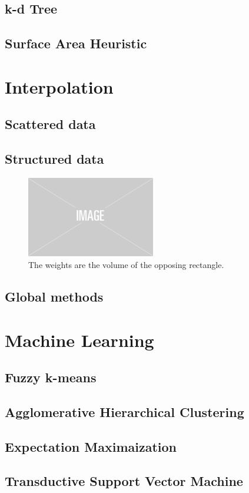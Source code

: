 \subsection{k-d Tree}
\subsection{Surface Area Heuristic}

\section{Interpolation}
\subsection{Scattered data}
\subsection{Structured data}

\label{ch:fu:trilinear}

\begin{figure}
    \centering
    \includegraphics[width=0.5\textwidth]{figures/img-placeholder.png}
    \caption{The weights are the volume of the opposing rectangle.}
    \label{fig:bilinear}
\end{figure}
\subsection{Global methods}


\section{Machine Learning}

\subsection{Fuzzy k-means}
\subsection{Agglomerative Hierarchical Clustering}
\subsection{Expectation Maximaization}
\subsection{Transductive Support Vector Machine}